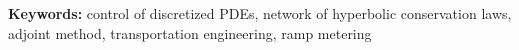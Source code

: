 {\bf Keywords:} control of discretized PDEs, network of hyperbolic conservation laws, adjoint method, transportation engineering, ramp metering